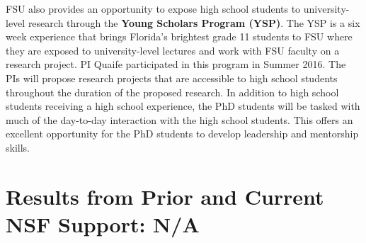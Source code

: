 \documentclass[11pt]{article}
\begin{document}
FSU also provides an opportunity to expose high school students to university-level research through the {\bf Young Scholars Program (YSP)}. The YSP is a six week experience that brings Florida's brightest grade 11 students to FSU where they are exposed to university-level lectures and work with FSU faculty on a research project. PI Quaife participated in this program in Summer 2016. The PIs will propose research projects that are accessible to high school students throughout the duration of the proposed research. In addition to high school students receiving a high school experience, the PhD students will be tasked with much of the day-to-day interaction with the high school students. This offers an excellent opportunity for the PhD students to develop leadership and mentorship skills.




\section{Results from Prior and Current NSF Support: N/A}


\newpage
\setcounter{page}{1}

%

\end{document}
